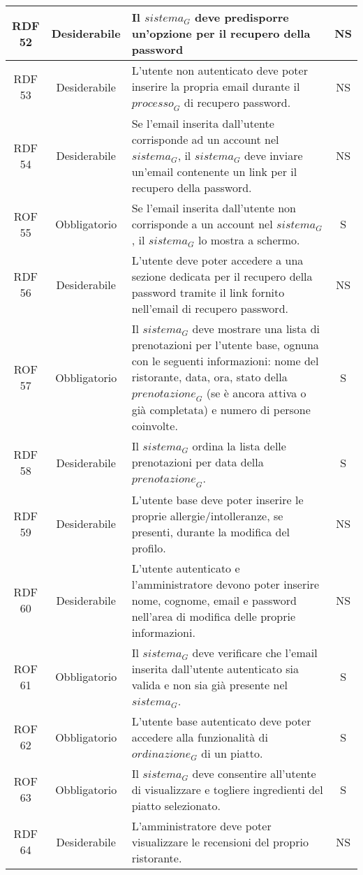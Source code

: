 \begin{longtable}{|c|c|p{12cm}|c|}
\hline
RDF 52& Desiderabile & Il $\textit{sistema}_G$ deve predisporre un'opzione per il recupero della password  & NS\\
\hline
RDF 53& Desiderabile & L'utente non autenticato deve poter inserire la propria email durante il $\textit{processo}_G$ di recupero password.  & NS\\
\hline
RDF 54 & Desiderabile & Se l'email inserita dall'utente corrisponde ad un account nel $\textit{sistema}_G$, il $\textit{sistema}_G$ deve inviare un'email contenente un link per il recupero della password.  & NS\\
\hline
ROF 55 & Obbligatorio & Se l'email inserita dall'utente non corrisponde a un account nel $\textit{sistema}_G$, il $\textit{sistema}_G$ lo mostra a schermo.  & S\\
\hline
RDF 56 & Desiderabile & L'utente deve poter accedere a una sezione dedicata per il recupero della password tramite il link fornito nell'email di recupero password.  & NS\\
\hline
ROF 57 & Obbligatorio & Il $\textit{sistema}_G$ deve mostrare una lista di prenotazioni per l'utente base, ognuna con le seguenti informazioni:
nome del ristorante, data, ora, stato della $\textit{prenotazione}_G$ (se è ancora attiva o già completata) e numero di persone coinvolte. & S\\
\hline
RDF 58 & Desiderabile & Il $\textit{sistema}_G$ ordina la lista delle prenotazioni per data della $\textit{prenotazione}_G$.  & S\\
\hline
RDF 59 & Desiderabile & L'utente base deve poter inserire le proprie allergie/intolleranze, se presenti, durante la modifica del profilo.  & NS\\
\hline
RDF 60 & Desiderabile & L'utente autenticato e l'amministratore devono poter inserire nome, cognome, email e password nell'area di modifica delle proprie informazioni.  & NS\\
\hline
ROF 61 &  Obbligatorio & Il $\textit{sistema}_G$ deve verificare che l'email inserita dall'utente autenticato sia valida e non sia già presente nel $\textit{sistema}_G$.  & S\\
\hline
ROF 62 &  Obbligatorio & L'utente base autenticato deve poter accedere alla funzionalità di $\textit{ordinazione}_G$ di un piatto.  & S\\
\hline
ROF 63 &  Obbligatorio & Il $\textit{sistema}_G$ deve consentire all'utente di visualizzare e togliere ingredienti del piatto selezionato.  & S\\
\hline
RDF 64 & Desiderabile & L'amministratore deve poter visualizzare le recensioni del proprio ristorante. & NS\\ 

\end{longtable}
